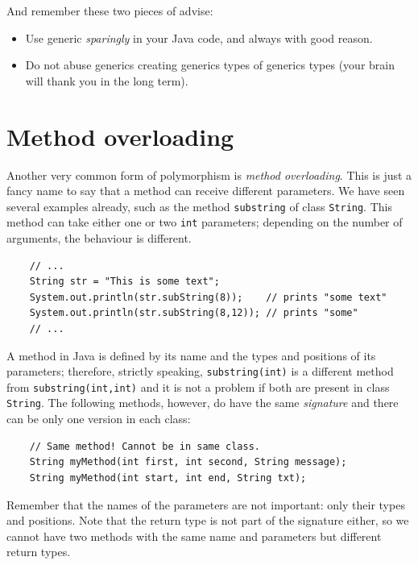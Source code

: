 And remember these two pieces of advise: 

\begin{itemize}
\item Use generic \emph{sparingly} in your Java code, and always with
  good reason.
\item Do not abuse generics creating generics types of generics types
  (your brain will thank you in the long term).
\end{itemize}



\section{Method overloading}
\label{sec:method-overloading}

Another very common form of polymorphism is \emph{method
  overloading}. This is just a fancy name to say that a method can
receive different parameters. We have seen several examples already,
such as the method \verb+substring+ of class \verb+String+. This
method can take either one or two \verb+int+ parameters; depending on
the number of arguments, the behaviour is different. 

\begin{verbatim}
    // ...
    String str = "This is some text";
    System.out.println(str.subString(8));    // prints "some text"
    System.out.println(str.subString(8,12)); // prints "some"
    // ...
\end{verbatim}

A method in Java is defined by its name and the types and positions of
its parameters; therefore, strictly speaking, \verb+substring(int)+ is
a different method from \verb+substring(int,int)+ and it is not a
problem if both are present in class \verb+String+. The following
methods, however, do have the same \emph{signature} and there can be
only one version in each class: 

\begin{verbatim}
    // Same method! Cannot be in same class.
    String myMethod(int first, int second, String message);
    String myMethod(int start, int end, String txt);
\end{verbatim}

Remember that the names of the parameters are not important: only their types and
positions. Note that the return type is not part of the signature
either, so we cannot have two methods with the same name and
parameters but different return types. 

